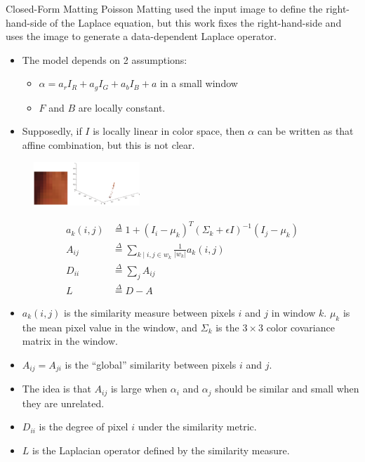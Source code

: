 \documentclass{beamer}
\providecommand{\defeq}{\stackrel{\Delta}{=}}
\begin{document}
\begin{frame}[allowframebreaks]{Closed-Form Matting \cite{levin2008closed}}
 Poisson Matting used the input image to define the right-hand-side of the
 Laplace equation, but this work fixes the right-hand-side and uses the
 image to generate a data-dependent Laplace operator.
 \begin{itemize}
  \item The model depends on 2 assumptions:
  \begin{itemize}
   \item $\alpha = a_r I_R + a_g I_G + a_b I_B + a$ in a small window
   \item $F$ and $B$ are locally constant.
  \end{itemize}
  \item Supposedly, if $I$ is locally linear in color space, then $\alpha$
        can be written as that affine combination, but this is not clear.
 \end{itemize}
 \begin{figure}
  \includegraphics[width=4cm]{images/colorline.png}
 \end{figure}
 \begin{align}
  a_k(i,j) &\defeq 1 + (I_i-\mu_k)^T \left(\Sigma_k + \epsilon I\right)^{-1} (I_j-\mu_k) \\
  A_{ij} &\defeq \sum_{k \mid i,j \in w_k} \frac{1}{\lvert w_k \rvert} a_k(i,j) \\
  D_{ii} &\defeq \sum_j A_{ij} \\
  L &\defeq D-A
 \end{align}
 \begin{itemize}
  \item $a_k(i,j)$ is the similarity measure between pixels $i$ and $j$ in
        window $k$. $\mu_k$ is the mean pixel value in the window, and $\Sigma_k$
        is the $3 \times 3$ color covariance matrix in the window.
  \item $A_{ij} = A_{ji}$ is the ``global'' similarity between pixels $i$ and $j$.
  \item The idea is that $A_{ij}$ is large when $\alpha_i$ and $\alpha_j$ should be
        similar and small when they are unrelated.
  \item $D_{ii}$ is the degree of pixel $i$ under the similarity metric.
  \item $L$ is the Laplacian operator defined by the similarity measure.

\end{itemize}
\end{frame}
\end{document}
